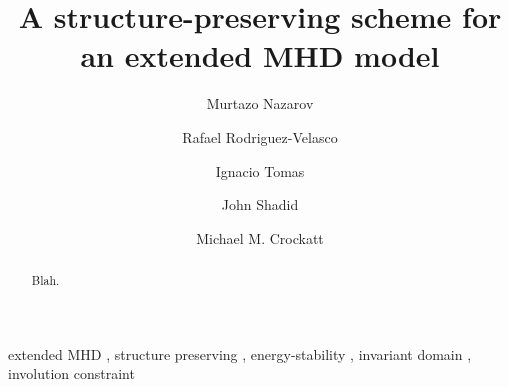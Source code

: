 \documentclass[preprint,1p]{elsarticle}
\begin{document}
\begin{frontmatter}
\title{A structure-preserving scheme for an extended MHD model}
  \author[1]{Murtazo Nazarov}
  \author[1]{Rafael Rodriguez-Velasco}
  \author[2]{Ignacio Tomas}
  \author[3,4]{John Shadid}
  \author[3]{Michael M. Crockatt}
  \address[1]{Department of Information Technology, Uppsala University, Sweden}
  \address[2]{Department of Mathematics \& Statistics Texas Tech University}
  \address[3]{Sandia National Laboratories, P.O. Box 5800, MS 1320,
              Albuquerque, NM 87185, USA}
  \address[4]{Department of Mathematics and Statistics, University of New
  Mexico, MSC01 1115, Albuquerque, NM 87131, United States}
\begin{abstract}

Blah.
\end{abstract}

\begin{keyword}
extended MHD \sep
structure preserving \sep
energy-stability \sep
invariant domain \sep
involution constraint
\end{keyword}

\end{frontmatter}
\end{document}
